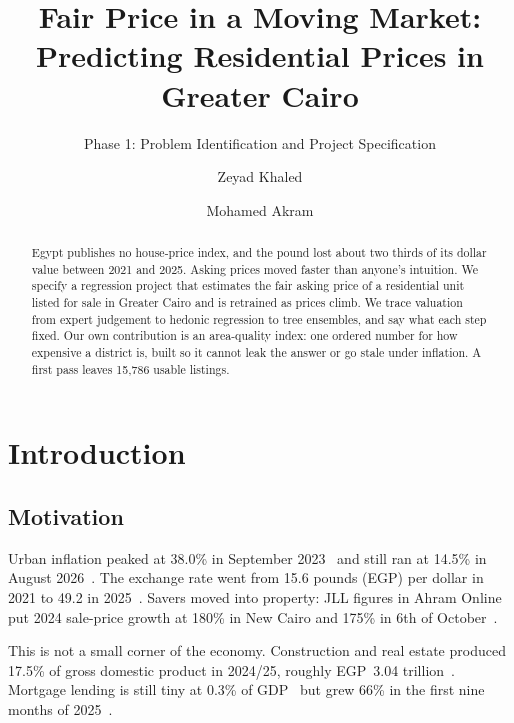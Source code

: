 \documentclass[sigconf,nonacm,10pt]{acmart}
\begin{document}
\title{Fair Price in a Moving Market: Predicting Residential Prices in Greater Cairo}
\subtitle{Phase 1: Problem Identification and Project Specification}

\author{Zeyad Khaled}

\author{Mohamed Akram}

\begin{abstract}
Egypt publishes no house-price index, and the pound lost about two thirds of its dollar value between 2021 and 2025. Asking prices moved faster than anyone's intuition. We specify a regression project that estimates the fair asking price of a residential unit listed for sale in Greater Cairo and is retrained as prices climb. We trace valuation from expert judgement to hedonic regression to tree ensembles, and say what each step fixed. Our own contribution is an area-quality index: one ordered number for how expensive a district is, built so it cannot leak the answer or go stale under inflation. A first pass leaves 15,786 usable listings.
\end{abstract}


\maketitle

\section{Introduction}

\subsection{Motivation}
Urban inflation peaked at 38.0\% in September 2023~\cite{capmas_sep23} and still ran at 14.5\% in August 2026~\cite{capmas_aug26}. The exchange rate went from 15.6 pounds (EGP) per dollar in 2021 to 49.2 in 2025~\cite{wb_fx}. Savers moved into property: JLL figures in Ahram Online put 2024 sale-price growth at 180\% in New Cairo and 175\% in 6th of October~\cite{ahram2024jll}.

This is not a small corner of the economy. Construction and real estate produced 17.5\% of gross domestic product in 2024/25, roughly EGP~3.04 trillion~\cite{mped_gdp25}. Mortgage lending is still tiny at 0.3\% of GDP~\cite{dne2026mortgage} but grew 66\% in the first nine months of 2025~\cite{fra_mortgage}.
\end{document}
